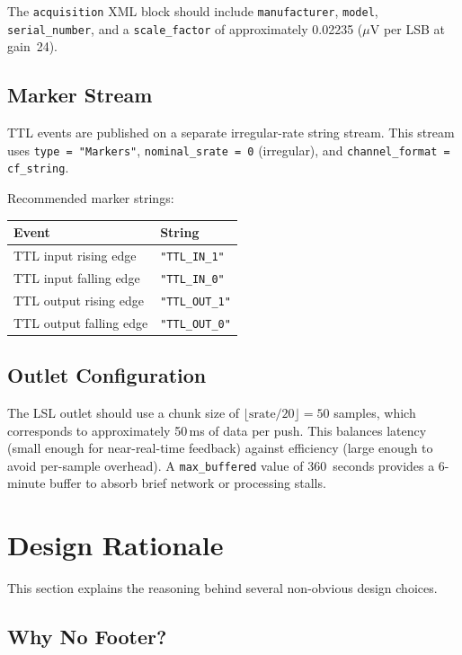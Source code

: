 \documentclass[11pt,a4paper]{article}
\begin{document}
The \texttt{acquisition} XML block should include \texttt{manufacturer}, \texttt{model}, \texttt{serial\_number}, and a \texttt{scale\_factor} of approximately 0.02235 ($\mu$V per LSB at gain~24).

\subsection{Marker Stream}

TTL events are published on a separate irregular-rate string stream.  This stream uses \texttt{type = "Markers"}, \texttt{nominal\_srate = 0} (irregular), and \texttt{channel\_format = cf\_string}.

Recommended marker strings:

\medskip
\begin{tabular}{ll}
\toprule
\textbf{Event} & \textbf{String} \\
\midrule
TTL input rising edge  & \texttt{"TTL\_IN\_1"} \\
TTL input falling edge & \texttt{"TTL\_IN\_0"} \\
TTL output rising edge & \texttt{"TTL\_OUT\_1"} \\
TTL output falling edge & \texttt{"TTL\_OUT\_0"} \\
\bottomrule
\end{tabular}
\medskip

\subsection{Outlet Configuration}

The LSL outlet should use a chunk size of $\lfloor \text{srate} / 20 \rfloor = 50$ samples, which corresponds to approximately 50\,ms of data per push.  This balances latency (small enough for near-real-time feedback) against efficiency (large enough to avoid per-sample overhead).  A \texttt{max\_buffered} value of 360~seconds provides a 6-minute buffer to absorb brief network or processing stalls.

\section{Design Rationale}
\label{sec:rationale}

This section explains the reasoning behind several non-obvious design choices.

\subsection{Why No Footer?}
\end{document}
